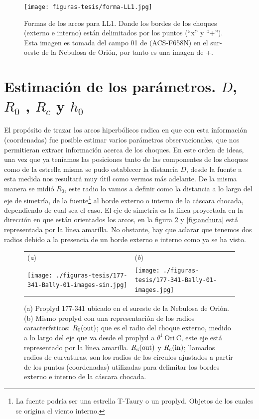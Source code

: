 \begin{figure}
  \centering
   \texttt{[image: figuras-tesis/forma-LL1.jpg]}
  \caption{Formas de los arcos para LL1. Donde los bordes de los choques (externo e interno) están delimitados por los puntos (``x'' y ``+''). Esta imagen es tomada del campo 01 de \citet{Bally:2006a} (ACS-F658N) en el sur-oeste de la Nebulosa de Orión, por tanto es una imagen de \ha{}+\nii{}. }
  \label{fig:arco-LL1}
\end{figure}

\section{Estimación de los parámetros. \(D\), \(R_{0}\) , \(R_{c}\) y \(h_{0}\) }
\label{sec:parametros}

El propósito de trazar los arcos hiperbólicos radica en  que con esta información (coordenadas) fue posible estimar varios parámetros observacionales, que nos permitieran extraer información acerca de los choques. En este orden de ideas, una vez que ya teníamos las posiciones tanto de las componentes de los choques como de la estrella misma se pudo establecer la distancia \(D\), desde la fuente a \thC{} esta medida nos resultará muy útil como vermos más adelante. De la misma manera se midió \(R_{0}\), este radio lo vamos a definir como la distancia a lo largo del eje de simetría, de la fuente\footnote{La fuente podría ser una estrella T-Taury o un proplyd. Objetos de los cuales se origina el viento interno.} \citep{Robberto:2005}  al borde externo o interno de la cáscara chocada, dependiendo de cual sea el caso. El eje de simetría es la línea proyectada en la dirección en que están orientados los arcos, en la figura \ref{fig:radios} y \ref{fig:anchura} está representada por la línea amarilla. No obstante, hay que aclarar que tenemos dos radios debido a la presencia de un borde externo e interno como ya se ha visto. \\ 

\begin{figure}[htp]
\centering
\begin{tabular}{l l}
(\textit{a}) & (\textit{b})  \\
  \texttt{[image: ./figuras-tesis/177-341-Bally-01-images-sin.jpg]}&
 \texttt{[image: ./figuras-tesis/177-341-Bally-01-images.jpg]}\\
\end{tabular}
\caption{(a) Proplyd 177-341 ubicado en el sureste de la Nebulosa de Orión. (b) Mismo proplyd con una representación de los radios caracterŕsticos: \(R_{0}(\mathrm{out}{})\); que es el radio del choque externo, medido a lo largo del eje que va desde el proplyd a \(\theta^1\ \text{Ori}\ \text{C}\), este eje está representado por la línea amarilla. \(R_{c}(\mathrm{out}{})\) y \(R_{c}(\mathrm{in}{})\); llamados radios de curvaturas, son los radios de los círculos ajustados a partir de los puntos (coordenadas) utilizadas para delimitar los bordes externo e interno de la cáscara chocada. }\label{fig:radios}
\end{figure}

